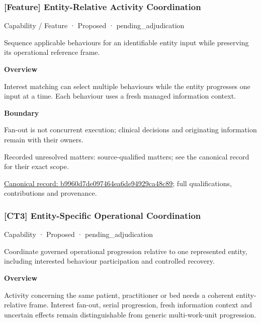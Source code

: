 \subsubsection{[Feature] Entity-Relative Activity Coordination}

\label{element:b9960d7de097464ea6de94929ca48c89}
{\small Capability / Feature · Proposed · pending\_adjudication}\par

Sequence applicable behaviours for an identifiable entity input while preserving its operational reference frame.



\textbf{Overview}



Interest matching can select multiple behaviours while the entity progresses one input at a time. Each behaviour uses a fresh managed information context.



\textbf{Boundary}



Fan-out is not concurrent execution; clinical decisions and originating information remain with their owners.


{\small Recorded unresolved matters: source-qualified matters; see the canonical record for their exact scope.}\par
{\footnotesize \href{../../../../continuum/strategy/capability/feature/b9960d7de097464ea6de94929ca48c89.md}{Canonical record: b9960d7de097464ea6de94929ca48c89}; full qualifications, contributions and provenance.}\par
\subsubsection{[CT3] Entity-Specific Operational Coordination}

\label{element:9f0c1429b64f4f88982fbbda6eaec233}
{\small Capability · Proposed · pending\_adjudication}\par

Coordinate governed operational progression relative to one represented entity, including interested behaviour participation and controlled recovery.



\textbf{Overview}



Activity concerning the same patient, practitioner or bed needs a coherent entity-relative frame. Interest fan-out, serial progression, fresh information context and uncertain effects remain distinguishable from generic multi-work-unit progression.



